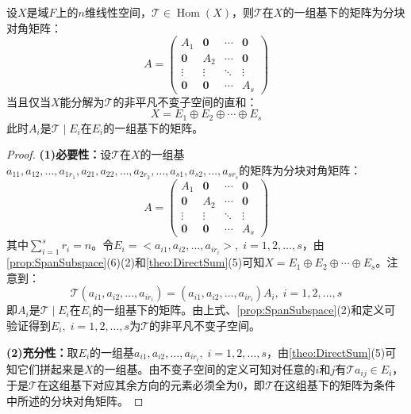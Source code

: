 \begin{theorem}\label{theo:BlockDiagonalizationInvariantSubspace}
	设$X$是域$F$上的$n$维线性空间，$\mathcal{T}\in\operatorname{Hom}(X)$，则$\mathcal{T}$在$X$的一组基下的矩阵为分块对角矩阵：
	\begin{equation*}
		A=
		\begin{pmatrix}
			A_1 &\mathbf{0} & \cdots & \mathbf{0} \\
			\mathbf{0} & A_2 & \cdots & \mathbf{0} \\
			\vdots & \vdots & \ddots & \vdots \\
			\mathbf{0} & \mathbf{0} & \cdots & A_s
		\end{pmatrix} 
	\end{equation*}
	当且仅当$X$能分解为$\mathcal{T}$的非平凡不变子空间的直和：
	\begin{equation*}
		X=E_1\oplus E_2\oplus\cdots\oplus E_s
	\end{equation*}
	此时$A_i$是$\mathcal{T}\mid E_i$在$E_i$的一组基下的矩阵。
\end{theorem}
\begin{proof}
	\textbf{(1)必要性：}设$\mathcal{T}$在$X$的一组基$a_{11},a_{12},\dots,a_{1r_1},a_{21},a_{22},\dots,a_{2r_2},\dots,a_{s1},a_{s2},\dots,a_{sr_s}$的矩阵为分块对角矩阵：
	\begin{equation*}
		A=
		\begin{pmatrix}
			A_1 &\mathbf{0} & \cdots & \mathbf{0} \\
			\mathbf{0} & A_2 & \cdots & \mathbf{0} \\
			\vdots & \vdots & \ddots & \vdots \\
			\mathbf{0} & \mathbf{0} & \cdots & A_s
		\end{pmatrix} 
	\end{equation*}
	其中$\sum\limits_{i=1}^{s}r_i=n$。令$E_i=<a_{i1},a_{i2},\dots,a_{ir_i}>,\;i=1,2,\dots,s$，由\cref{prop:SpanSubspace}(6)(2)和\cref{theo:DirectSum}(5)可知$X=E_1\oplus E_2\oplus\cdots\oplus E_s$。注意到：
	\begin{equation*}
		\mathcal{T}(a_{i1},a_{i2},\dots,a_{ir_i})=(a_{i1},a_{i2},\dots,a_{ir_i})A_i,\;i=1,2,\dots,s
	\end{equation*}
	即$A_i$是$\mathcal{T}\mid E_i$在$E_i$的一组基下的矩阵。由上式、\cref{prop:SpanSubspace}(2)和定义可验证得到$E_i,\;i=1,2,\dots,s$为$\mathcal{T}$的非平凡不变子空间。\par
	\textbf{(2)充分性：}取$E_i$的一组基$a_{i1},a_{i2},\dots,a_{ir_i},\;i=1,2,\dots,s$，由\cref{theo:DirectSum}(5)可知它们拼起来是$X$的一组基。由不变子空间的定义可知对任意的$i$和$j$有$\mathcal{T}a_{ij}\in E_i$，于是$\mathcal{T}$在这组基下对应其余方向的元素必须全为$0$，即$\mathcal{T}$在这组基下的矩阵为条件中所述的分块对角矩阵。
\end{proof}
